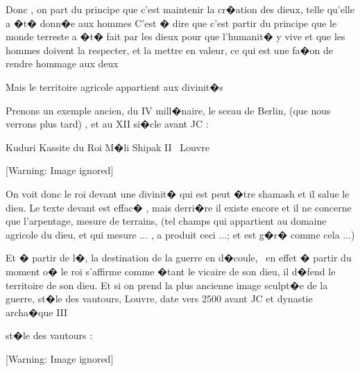\documentclass{article}
\begin{document}
\bigskip

Donc , on part du principe que c'est maintenir la cr�ation des dieux, telle qu'elle a �t� donn�e aux hommes C'est � dire que c'est partir du principe que le monde terreste a �t� fait par les dieux pour que l'humanit� y vive et que les hommes doivent la respecter, et la mettre en valeur, ce qui est une fa�on de rendre hommage aux deux

Mais le territoire agricole appartient aux divinit�s


\bigskip

Prenons un exemple ancien, du IV mill�naire, le sceau de Berlin, (que nous verrons plus tard) , et au XII si�cle avant JC :


\bigskip

Kuduri Kassite du Roi M�li Shipak II \ Louvre


\bigskip

  [Warning: Image ignored] %
 

On voit donc le roi devant une divinit� qui est peut �tre shamash et il salue le dieu. Le texte devant est effac� , mais derri�re il existe encore et il ne concerne que l'arpentage, mesure de terrains, (tel champs qui appartient au domaine agricole du dieu, et qui mesure ... , a produit ceci ...; et est g�r� comme cela ...)


\bigskip

Et � partir de l�, la destination de la guerre en d�coule, \ en effet � partir du moment o� le roi s'affirme comme �tant le vicaire de son dieu, il d�fend le territoire de son dieu. Et si on prend la plus ancienne image sculpt�e de la guerre, st�le des vautours, Louvre, date vers 2500 avant JC et dynastie archa�que III


\bigskip

st�le des vautours : 


\bigskip

  [Warning: Image ignored] %
 


\bigskip


\bigskip


\bigskip


\bigskip


\bigskip


\bigskip
\end{document}
